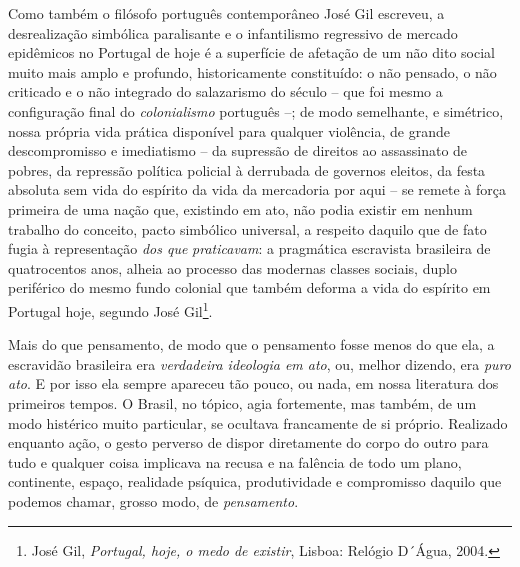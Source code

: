 Como também o filósofo português contemporâneo José Gil escreveu, a
desrealização simbólica paralisante e o infantilismo regressivo de
mercado epidêmicos no Portugal de hoje é a superfície de afetação de um
não dito social muito mais amplo e profundo, historicamente constituído:
o não pensado, o não criticado e o não integrado do salazarismo do
século  -- que foi mesmo a configuração final do \emph{colonialismo}
português --; de modo semelhante, e simétrico, nossa própria vida
prática disponível para qualquer violência, de grande descompromisso e
imediatismo -- da supressão de direitos ao assassinato de pobres, da
repressão política policial à derrubada de governos eleitos, da festa
absoluta sem vida do espírito da vida da mercadoria por aqui -- se
remete à força primeira de uma nação que, existindo em ato, não podia
existir em nenhum trabalho do conceito, pacto simbólico universal, a
respeito daquilo que de fato fugia à representação \emph{dos que}
\emph{praticavam}: a pragmática escravista brasileira de quatrocentos
anos, alheia ao processo das modernas classes sociais, duplo periférico
do mesmo fundo colonial que também deforma a vida do espírito em
Portugal hoje, segundo José Gil\footnote{José Gil, \emph{Portugal, hoje,
  o medo de existir}, Lisboa: Relógio D´Água, 2004.}.

Mais do que pensamento, de modo que o pensamento fosse menos do que ela,
a escravidão brasileira era \emph{verdadeira ideologia em ato}, ou,
melhor dizendo, era \emph{puro} \emph{ato}. E por isso ela sempre
apareceu tão pouco, ou nada, em nossa literatura dos primeiros tempos. O
Brasil, no tópico, agia fortemente, mas também, de um modo histérico
muito particular, se ocultava francamente de si próprio. Realizado
enquanto ação, o gesto perverso de dispor diretamente do corpo do outro
para tudo e qualquer coisa implicava na recusa e na falência de todo um
plano, continente, espaço, realidade psíquica, produtividade e
compromisso daquilo que podemos chamar, grosso modo, de
\emph{pensamento}.

